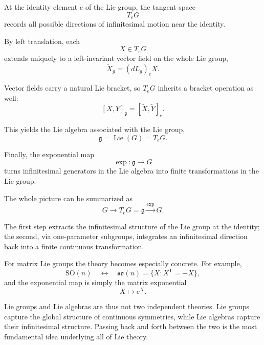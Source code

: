 \documentclass[11pt]{article}
\begin{document}
At the identity element $e$ of the Lie group, the tangent space
\[
T_eG
\]
records all possible directions of infinitesimal motion near the identity.

By left translation, each
\[
X\in T_eG
\]
extends uniquely to a left-invariant vector field on the whole Lie group,
\[
\widetilde X_g=(dL_g)_eX.
\]

Vector fields carry a natural Lie bracket, so $T_eG$ inherits a bracket operation as well:
\[
[X,Y]_{\mathfrak g}
=
[\widetilde X,\widetilde Y]_e.
\]

This yields the Lie algebra associated with the Lie group,
\[
\mathfrak g
=
\operatorname{Lie}(G)
=
T_eG.
\]

Finally, the exponential map
\[
\exp:\mathfrak g\to G
\]
turns infinitesimal generators in the Lie algebra into finite transformations in the Lie group.

The whole picture can be summarized as
\[
\boxed{
G
\longrightarrow
T_eG=\mathfrak g
\overset{\exp}{\longrightarrow}
G.
}
\]

The first step extracts the infinitesimal structure of the Lie group at the identity; the second, via one-parameter subgroups, integrates an infinitesimal direction back into a finite continuous transformation.

For matrix Lie groups the theory becomes especially concrete. For example,
\[
\mathrm{SO}(n)
\quad\longleftrightarrow\quad
\mathfrak{so}(n)
=
\{X:X^{\mathsf T}=-X\},
\]
and the exponential map is simply the matrix exponential
\[
X\longmapsto e^X.
\]

Lie groups and Lie algebras are thus not two independent theories. Lie groups capture the global structure of continuous symmetries, while Lie algebras capture their infinitesimal structure. Passing back and forth between the two is the most fundamental idea underlying all of Lie theory.
\end{document}
